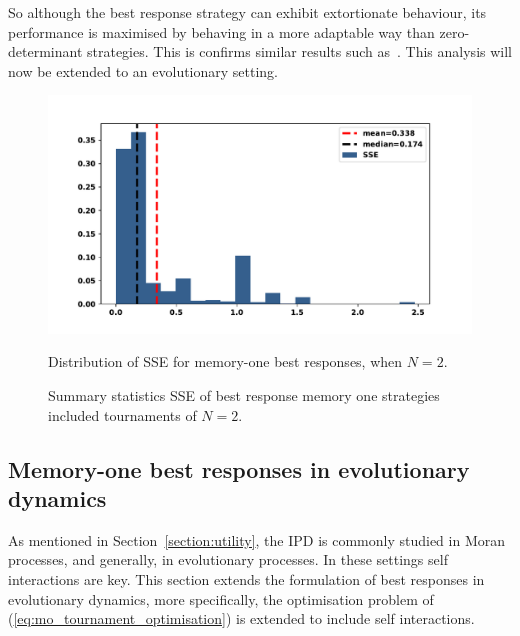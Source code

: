 \documentclass[10pt]{article}
\begin{document}
So although the best response strategy can exhibit extortionate behaviour, its
performance is maximised by behaving in a more adaptable way than zero-determinant
strategies. This is confirms similar results such as~\cite{Knight2019}.
This analysis will now be extended to an evolutionary setting.

\begin{figure}[!htbp]
    \begin{minipage}{0.72\textwidth}
            \begin{center}
                \includegraphics[width=\linewidth]{img/best_respones_sserror.pdf}
            \end{center}
                \caption{Distribution of SSE for memory-one best responses, when \(N=2\).}
                \label{fig:sserror_mem_one}
    \end{minipage}\hspace{1cm}
    \begin{minipage}{0.21\textwidth}
        \centering
        \captionsetup{type=table}
        \resizebox{.85\columnwidth}{!}{%
            }
            \caption{Summary statistics SSE of best response memory one strategies included
            tournaments of \(N=2\).}
            \label{table:sserror_stats}
      \end{minipage}
\end{figure}

\subsection{Memory-one best responses in evolutionary dynamics}\label{subsection:best_respnse_evolutionary_setting}

As mentioned in Section~\ref{section:utility}, the IPD is commonly studied in
Moran processes, and generally, in evolutionary processes. In these settings self
interactions are key. This section extends the formulation of best responses
in evolutionary dynamics, more specifically, the optimisation problem of
(\ref{eq:mo_tournament_optimisation}) is extended to
include self interactions.
\end{document}
